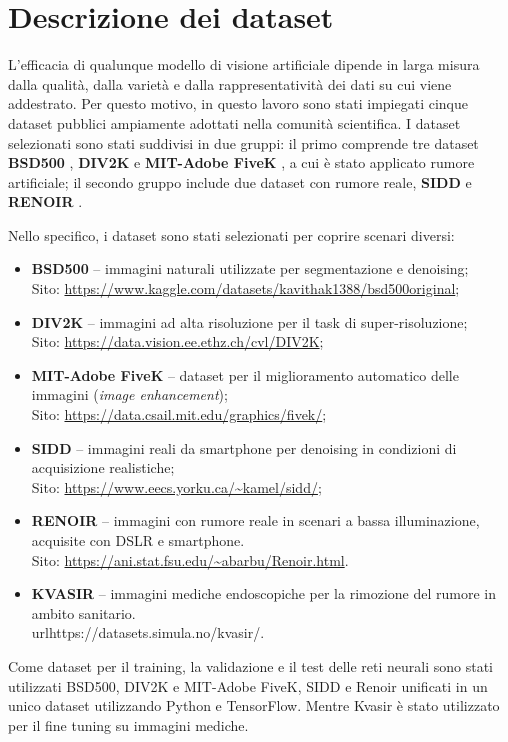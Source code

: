 \documentclass[12pt,a4paper,openright,twoside]{book}
\begin{document}
\chapter{Descrizione dei dataset}
L'efficacia di qualunque modello di visione artificiale dipende in larga misura dalla qualità, dalla varietà e dalla rappresentatività dei dati su cui viene addestrato. Per questo motivo, in questo lavoro sono stati impiegati cinque dataset pubblici ampiamente adottati nella comunità scientifica. I dataset selezionati sono stati suddivisi in due gruppi: il primo comprende tre dataset \textbf{BSD500} \parencite{MartinFTM01}, \textbf{DIV2K} \parencite{Ignatov_2018_ECCV_Workshops} e \textbf{MIT-Adobe FiveK} \parencite{5995413}, a cui è stato applicato rumore artificiale; il secondo gruppo include due dataset con rumore reale, \textbf{SIDD} \parencite{Abdelhamed_2019_CVPR_Workshops} e \textbf{RENOIR} \parencite{anaya2014renoir}.

Nello specifico, i dataset sono stati selezionati per coprire scenari diversi:

\begin{itemize}
  \item \textbf{BSD500} – immagini naturali utilizzate per segmentazione e denoising;\\Sito: \url{https://www.kaggle.com/datasets/kavithak1388/bsd500original};
  \item \textbf{DIV2K} – immagini ad alta risoluzione per il task di super-risoluzione;\\Sito: \url{https://data.vision.ee.ethz.ch/cvl/DIV2K};
  \item \textbf{MIT-Adobe FiveK} – dataset per il miglioramento automatico delle immagini (\textit{image enhancement});\\Sito: \url{https://data.csail.mit.edu/graphics/fivek/};
  \item \textbf{SIDD} – immagini reali da smartphone per denoising in condizioni di acquisizione realistiche;\\Sito: \url{https://www.eecs.yorku.ca/~kamel/sidd/};
  \item \textbf{RENOIR} – immagini con rumore reale in scenari a bassa illuminazione, acquisite con DSLR e smartphone.\\Sito: \url{https://ani.stat.fsu.edu/~abarbu/Renoir.html}.
  \item \textbf{KVASIR} – immagini mediche endoscopiche per la rimozione del rumore in ambito sanitario.\\url{https://datasets.simula.no/kvasir/}.
\end{itemize}
Come dataset per il training, la validazione e il test delle reti neurali sono stati utilizzati BSD500, DIV2K e MIT-Adobe FiveK, SIDD e Renoir unificati in un unico dataset utilizzando Python e TensorFlow. Mentre Kvasir è stato utilizzato per il fine tuning su immagini mediche.
\newpage
\end{document}
